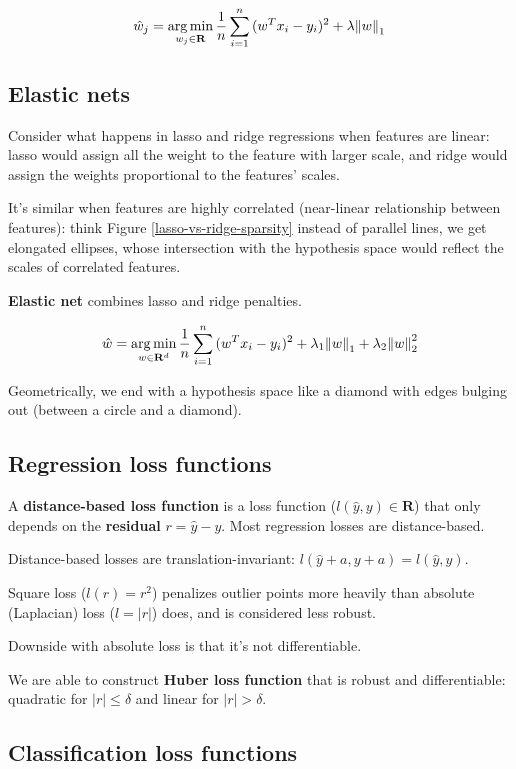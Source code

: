 \documentclass{article}
\DeclareMathOperator*{\argmin}{arg\,min}
\begin{document}
$$
\hat{w}_j = \argmin_{w_j \in \mathbf{R}}{\frac{1}{n} \sum_{i = 1}^{n}{(w^{T} x_i - y_i)^2} + \lambda \norm{w}_1}
$$

\subsection{Elastic nets}

Consider what happens in lasso and ridge regressions when features are linear:
lasso would assign all the weight to the feature with larger scale, and ridge would assign the weights proportional to the features' scales.

It's similar when features are highly correlated (near-linear relationship between features):
think Figure \ref{lasso-vs-ridge-sparsity} instead of parallel lines, we get elongated ellipses, whose intersection with the hypothesis space would reflect the scales of correlated features.

\textbf{Elastic net} combines lasso and ridge penalties.

$$
\hat{w} = \argmin_{w \in \mathbf{R}^{d}}{\frac{1}{n} \sum_{i = 1}^{n}{(w^{T} x_i - y_i)^2} + \lambda_1 \norm{w}_1 + \lambda_2 \norm{w}_2^2}
$$

Geometrically, we end with a hypothesis space like a diamond with edges bulging out (between a circle and a diamond).

\subsection{Regression loss functions}

A \textbf{distance-based loss function} is a loss function ($\mathit{l}(\hat{y}, y) \in \mathbf{R}$) that only depends on the \textbf{residual} $r = \hat{y} - y$.
Most regression losses are distance-based.

Distance-based losses are translation-invariant: $\mathit{l}(\hat{y} + a, y + a) = \mathit{l}(\hat{y}, y)$.

Square loss ($\mathit{l}(r) = r^2$) penalizes outlier points more heavily than absolute (Laplacian) loss ($\mathit{l} = |r|$) does, and is considered less robust.

Downside with absolute loss is that it's not differentiable.

We are able to construct \textbf{Huber loss function} that is robust and differentiable: quadratic for $|r| \leq \delta$ and linear for $|r| > \delta$.

\subsection{Classification loss functions}
\end{document}
